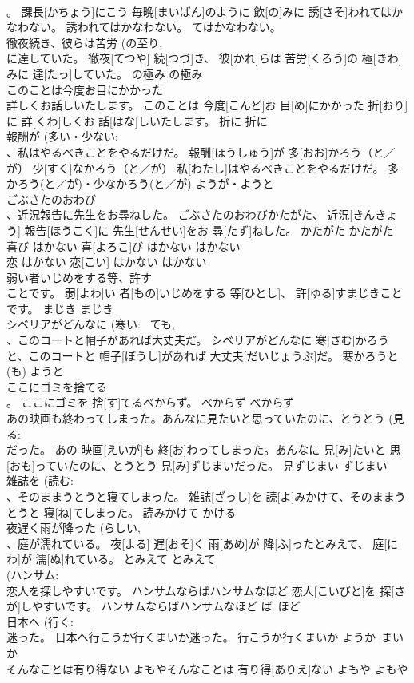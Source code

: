 \documentclass[8pt]{extreport}
\begin{document}
\begin{CJK}{UTF8}{min}
\\	。	課長[かちょう]にこう 毎晩[まいばん]のように 飲[の]みに 誘[さそ]われてはかなわない。	誘われてはかなわない。	てはかなわない。	
\\	徹夜続き、彼らは苦労 (の至り, 
\\	に達していた。	徹夜[てつや] 続[つづ]き、 彼[かれ]らは 苦労[くろう]の 極[きわ]みに 達[たっ]していた。	の極み	の極み	
\\	このことは今度お目にかかった 
\\	詳しくお話しいたします。	このことは 今度[こんど]お 目[め]にかかった 折[おり]に 詳[くわ]しくお 話[はな]しいたします。	折に	折に	
\\	報酬が (多い・少ない: 
\\	、私はやるべきことをやるだけだ。	報酬[ほうしゅう]が 多[おお]かろう（と／が） 少[すく]なかろう（と／が） 私[わたし]はやるべきことをやるだけだ。	多かろう(と／が)・少なかろう(と／が)	ようが・ようと	
\\	ごぶさたのおわび 
\\	、近況報告に先生をお尋ねした。	ごぶさたのおわびかたがた、 近況[きんきょう] 報告[ほうこく]に 先生[せんせい]をお 尋[たず]ねした。	かたがた	かたがた	
\\	喜び	はかない 喜[よろこ]び	はかない	はかない~	
\\	恋	はかない 恋[こい]	はかない	はかない~	
\\	弱い者いじめをする等、許す 
\\	ことです。	弱[よわ]い 者[もの]いじめをする 等[ひとし]、 許[ゆる]すまじきことです。	まじき	まじき	
\\	シベリアがどんなに (寒い: ~ても, 
\\	、このコートと帽子があれば大丈夫だ。	シベリアがどんなに 寒[さむ]かろうと、このコートと 帽子[ぼうし]があれば 大丈夫[だいじょうぶ]だ。	寒かろうと(も)	ようと	
\\	ここにゴミを捨てる 
\\	。	ここにゴミを 捨[す]てるべからず。	べからず	べからず	
\\	あの映画も終わってしまった。あんなに見たいと思っていたのに、とうとう (見る: 
\\	だった。	あの 映画[えいが]も 終[お]わってしまった。あんなに 見[み]たいと 思[おも]っていたのに、とうとう 見[み]ずじまいだった。	見ずじまい	ずじまい	
\\	雑誌を (読む: 
\\	、そのままうとうと寝てしまった。	雑誌[ざっし]を 読[よ]みかけて、そのままうとうと 寝[ね]てしまった。	読みかけて	かける	
\\	夜遅く雨が降った (らしい, 
\\	、庭が濡れている。	夜[よる] 遅[おそ]く 雨[あめ]が 降[ふ]ったとみえて、 庭[にわ]が 濡[ぬ]れている。	とみえて	とみえて	
\\	(ハンサム: 
\\	恋人を探しやすいです。	ハンサムならばハンサムなほど 恋人[こいびと]を 探[さが]しやすいです。	ハンサムならばハンサムなほど	ば~ほど	
\\	日本へ (行く: 
\\	迷った。	日本へ行こうか行くまいか迷った。	行こうか行くまいか	ようか~まいか	
\\	そんなことは有り得ない	よもやそんなことは 有り得[ありえ]ない	よもや	よもや	
\end{CJK}
\end{document}
